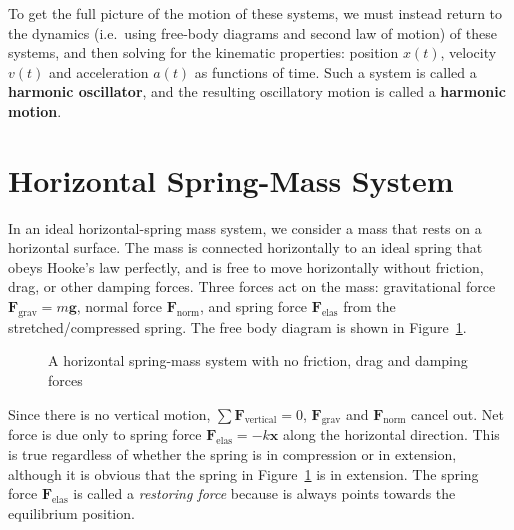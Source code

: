 To get the full picture of the motion of these systems, we must instead return
to the dynamics (i.e.\ using free-body diagrams and second law of motion) of
these systems, and then solving for the kinematic properties: position $x(t)$,
velocity $v(t)$ and acceleration $a(t)$ as functions of time. Such a system is
called a \textbf{harmonic oscillator}, and the resulting oscillatory motion is
called a \textbf{harmonic motion}.


\section{Horizontal Spring-Mass System}

In an ideal horizontal-spring mass system, we consider a mass that rests on a
horizontal surface. The mass is connected horizontally to an ideal spring that
obeys Hooke's law perfectly, and is free to move horizontally without friction,
drag, or other damping forces. Three forces act on the mass: gravitational
force $\bm F_\text{grav}=m\bm g$, normal force $\bm F_\text{norm}$,
and spring force $\bm F_\text{elas}$ from the stretched/compressed spring.
The free body diagram is shown in Figure~\ref{fig:horizontal-spring-mass1}.
\begin{figure}[bt]
  \centering
  \caption{A horizontal spring-mass system with no friction, drag and damping
    forces}
  \label{fig:horizontal-spring-mass1}
\end{figure}

Since there is no vertical motion, $\sum\bm F_\text{vertical}=0$,
$\bm F_\text{grav}$ and $\bm F_\text{norm}$ cancel out. Net force is due only to
spring force $\bm F_\text{elas}=-k\bm x$ along the horizontal direction. This is
true regardless of whether the spring is in compression or in extension,
although it is obvious that the spring in
Figure~\ref{fig:horizontal-spring-mass1} is in extension. The spring force
$\bm F_\text{elas}$ is called a \emph{restoring force} because is always points
towards the equilibrium position.


